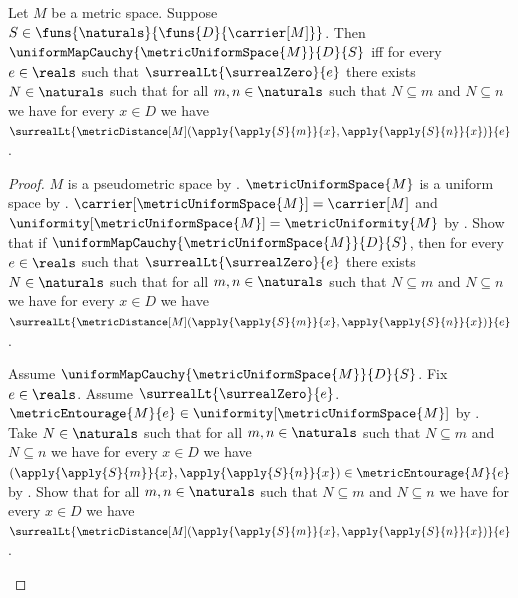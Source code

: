 \begin{theorem}\label{metric_uniform_map_cauchy_iff}
    Let $M$ be a metric space.
    Suppose $S\in\funs{\naturals}{\funs{D}{\carrier[M]}}$.
    Then $\uniformMapCauchy{\metricUniformSpace{M}}{D}{S}$ iff
        for every $e\in\reals$ such that
            $\surrealLt{\surrealZero}{e}$ there exists $N\in\naturals$
            such that for all $m,n\in\naturals$ such that
                $N\subseteq m$ and $N\subseteq n$ we have
                for every $x\in D$ we have
                $\surrealLt{\metricDistance[M]
                    (\apply{\apply{S}{m}}{x},
                     \apply{\apply{S}{n}}{x})}{e}$.
\end{theorem}
\begin{proof}
    $M$ is a pseudometric space by
        .
    $\metricUniformSpace{M}$ is a uniform space by
        .
    $\carrier[\metricUniformSpace{M}]=\carrier[M]$ and
        $\uniformity[\metricUniformSpace{M}]=\metricUniformity{M}$
        by
        .
    Show that if $\uniformMapCauchy
        {\metricUniformSpace{M}}{D}{S}$, then
        for every $e\in\reals$ such that
            $\surrealLt{\surrealZero}{e}$ there exists $N\in\naturals$
            such that for all $m,n\in\naturals$ such that
                $N\subseteq m$ and $N\subseteq n$ we have
                for every $x\in D$ we have
                $\surrealLt{\metricDistance[M]
                    (\apply{\apply{S}{m}}{x},
                     \apply{\apply{S}{n}}{x})}{e}$.
    \begin{subproof}
        Assume $\uniformMapCauchy{\metricUniformSpace{M}}{D}{S}$.
        Fix $e\in\reals$.
        Assume $\surrealLt{\surrealZero}{e}$.
        $\metricEntourage{M}{e}\in
            \uniformity[\metricUniformSpace{M}]$
            by
            .
        Take $N\in\naturals$ such that for all $m,n\in\naturals$
            such that $N\subseteq m$ and $N\subseteq n$ we have
            for every $x\in D$ we have
            $(\apply{\apply{S}{m}}{x},
             \apply{\apply{S}{n}}{x})\in\metricEntourage{M}{e}$
            by .
        Show that for all $m,n\in\naturals$ such that
            $N\subseteq m$ and $N\subseteq n$ we have
            for every $x\in D$ we have
            $\surrealLt{\metricDistance[M]
                (\apply{\apply{S}{m}}{x},
                 \apply{\apply{S}{n}}{x})}{e}$.

\end{subproof}
\end{proof}
